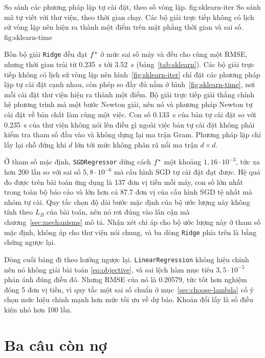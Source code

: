   {So sánh các phương pháp lặp tự cài đặt, theo số vòng lặp.}
  {fig:sklearn-iter}
  {So sánh mã tự viết với thư viện, theo thời gian chạy. Các bộ giải trực tiếp
   không có lịch sử vòng lặp nên hiện ra thành một điểm trên mặt phẳng thời gian
   và sai số.}
  {fig:sklearn-time}

Bốn bộ giải \texttt{Ridge} đều đạt $f^{*}$ ở mức sai số máy và đều cho cùng một
RMSE, nhưng thời gian trải từ \SI{0.235}{\second} tới \SI{3.52}{\second}
(bảng~\ref{tab:sklearn}). Các bộ giải trực tiếp không có lịch sử vòng lặp nên
hình~\ref{fig:sklearn-iter} chỉ đặt các phương pháp lặp tự cài đặt cạnh nhau, còn
phép so đầy đủ nằm ở hình~\ref{fig:sklearn-time}, nơi mỗi cài đặt thư viện hiện
ra thành một điểm. Bộ giải trực tiếp giải thẳng chính hệ phương trình mà
một bước Newton giải, nên nó và phương pháp Newton tự cài đặt về bản chất làm
cùng một việc. Con số \SI{0.133}{\second} của bản tự cài đặt so với
\SI{0.235}{\second} của thư viện không nói lên điều gì ngoài việc bản tự cài đặt
không phải kiểm tra tham số đầu vào và không dựng lại ma trận Gram. Phương pháp
lặp chỉ lấy lại chỗ đứng khi $d$ lớn tới mức không phân rã nổi ma trận
$d \times d$.

Ở tham số mặc định, \texttt{SGDRegressor} dừng cách $f^{*}$ một khoảng
$1{,}16 \cdot 10^{-3}$, tức xa hơn 200 lần so với sai số $5{,}8 \cdot 10^{-6}$ mà
cấu hình SGD tự cài đặt đạt được. Hệ quả đo được trên bài toán ứng dụng là
\num{137} đơn vị tiền mỗi máy, con số lớn nhất trong toàn bộ báo cáo và lớn hơn
cả \num{87.7} đơn vị của cấu hình SGD tệ nhất mà nhóm tự cài. Quy tắc chọn độ dài
bước mặc định của bộ ước lượng này không tính theo $L_B$ của bài toán, nên nó rơi
đúng vào lân cận mà chương~\ref{sec:mechanisms} mô tả. Nhận xét chỉ áp cho bộ ước
lượng này ở tham số mặc định, không áp cho thư viện nói chung, và ba dòng
\texttt{Ridge} phía trên là bằng chứng ngược lại.

Dòng cuối bảng đi theo hướng ngược lại. \texttt{LinearRegression} không
hiệu chỉnh nên nó không giải bài toán \eqref{eq:objective}, và sai lệch hàm mục
tiêu $3{,}5 \cdot 10^{-5}$ phản ánh đúng điều đó. Nhưng RMSE của nó là
\num{0.20579}, tức tốt hơn nghiệm đóng \num{5} đơn vị tiền, vì quy tắc một sai số
chuẩn ở mục~\ref{sec:choose-lambda} cố ý chọn mức hiệu chỉnh mạnh hơn mức tối ưu
về dự báo. Khoản đổi lấy là số điều kiện nhỏ hơn 100 lần.

\section{Ba câu còn nợ}
\label{sec:compare-open}

